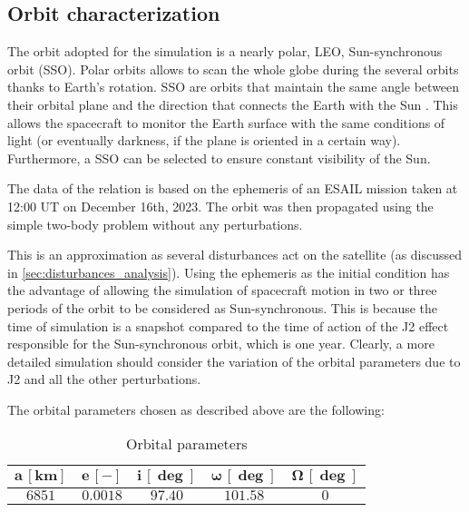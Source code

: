 \subsection{Orbit characterization}
\label{subsec:orbit_characterization}

The orbit adopted for the simulation is a nearly polar, LEO, Sun-synchronous orbit (SSO). Polar orbits allows to scan the whole globe during the several orbits thanks to Earth's rotation. SSO are orbits that maintain the same angle between their orbital plane and the direction that connects the Earth with the Sun \cite{curtis_book}. This allows the spacecraft to monitor the Earth surface with the same conditions of light (or eventually darkness, if the plane is oriented in a certain way). Furthermore, a SSO can be selected to ensure constant visibility of the Sun.\cite{esa_sso_site}

The data of the relation is based on the ephemeris of an ESAIL mission taken at 12:00 UT on December 16th, 2023. The orbit was then propagated using the simple two-body problem without any perturbations.

This is an approximation as several disturbances act on the satellite (as discussed in \autoref{sec:disturbances_analysis}). Using the ephemeris as the initial condition has the advantage of allowing the simulation of spacecraft motion in two or three periods of the orbit to be considered as Sun-synchronous. This is because the time of simulation is a snapshot compared to the time of action of the J2 effect responsible for the Sun-synchronous orbit, which is one year. Clearly, a more detailed simulation should consider the variation of the orbital parameters due to J2 and all the other perturbations.

The orbital parameters chosen as described above are the following:

\begin{table}[H]

    \centering
    \begin{tabular}{|c|c|c|c|c|}
    \hline
    $\bm{a \, [km]}$ & $\bm{e \, [-]}$ & $\bm{i \, [\deg]}$  & $\bm{\omega \, [\deg]}$   & $\bm{\Omega \, [\deg]}$ \\
    \hline
    $6851$ & $0.0018$ & $97.40$ & $101.58$ & $0$ \\
    \hline
    \end{tabular}
    
    \caption{Orbital parameters}
    \label{table:orb_table}
    
\end{table}


